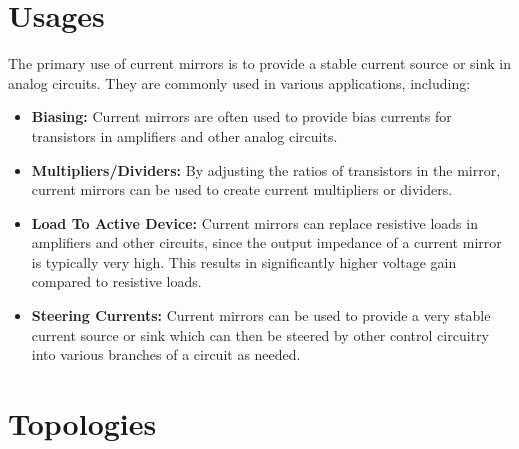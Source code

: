 \section{Usages}
The primary use of current mirrors is to provide a
stable current source or sink in analog circuits. They
are commonly used in various applications, including:
\begin{itemize}
  \item \textbf{Biasing:} Current mirrors are often used
    to provide bias currents for transistors in amplifiers
    and other analog circuits.
  \item \textbf{Multipliers/Dividers:} By adjusting
    the ratios of transistors in the mirror, current
    mirrors can be used to create current multipliers
    or dividers.
  \item \textbf{Load To Active Device:} Current mirrors
    can replace resistive loads in amplifiers and other
    circuits, since the output impedance of a current
    mirror is typically very high. This results in
    significantly higher voltage gain compared to
    resistive loads.
  \item \textbf{Steering Currents:} Current mirrors can
    be used to provide a very stable current source or
    sink which can then be steered by other control
    circuitry into various branches of a circuit as
    needed.
\end{itemize}

\section{Topologies}




